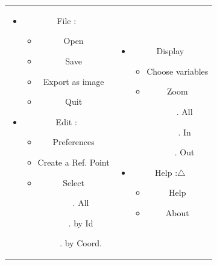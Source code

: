 \documentclass[a4paper]{article}
\begin{document}
\begin{tabular}{cc}
\begin{minipage}{0.5\linewidth}
\begin{itemize}
\item File :
  \begin{itemize}
  \item Open
  \item Save
  \item Export as image
  \item Quit
  \end{itemize}
\item Edit :
  \begin{itemize}
  \item Preferences
  \item Create a Ref. Point
  \item Select
    \begin{itemize}
    \item[.] All
    \item[.] by Id
    \item[.] by Coord.
    \end{itemize}
  \end{itemize}
\end{itemize}
\end{minipage}
&
\begin{minipage}{0.5\linewidth}
\begin{itemize}
\item Display
  \begin{itemize}
  \item Choose variables
  \item Zoom
    \begin{itemize}
    \item[.] All
    \item[.] In
    \item[.] Out
    \end{itemize}
  \end{itemize}
\item Help :$\triangle$
  \begin{itemize}
  \item Help 
  \item About
  \end{itemize}
\end{itemize}
\end{minipage}
\end{tabular}

\end{document}
